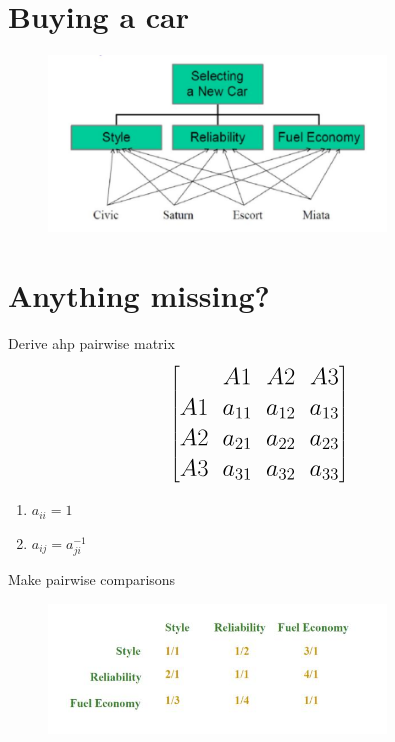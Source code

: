 \documentclass[aspectratio=1610,pdftex,dvipsnames,compress,xcolor={dvipsnames}]{beamer}
\newcommand{\acs}{\acrshort} %
\begin{document}
\section{Buying a car}


\addtocounter{framenumber}{-1}
\begin{frame}{}
    \begin{figure}
        \centering
        \includegraphics[width=0.80\textwidth]{ahp.car.jpg}
    \end{figure}
\end{frame}


\section{Anything missing?}


\addtocounter{framenumber}{-1}
\begin{frame}{Derive \acs{ahp} pairwise matrix}
    \begin{equation}
        \LARGE
        \begin{bmatrix}
               &A1 &A2 &A3 \\ 
            A1 &a_{11} &a_{12} &a_{13} \\ 
            A2 &a_{21} &a_{22} &a_{23} \\ 
            A3 &a_{31} &a_{32} &a_{33}
        \end{bmatrix} 
    \end{equation}

    \begin{enumerate}[series=outerlist,topsep=0pt,itemsep=5pt,leftmargin=*,label=(\arabic*)]
        \item[]$a_{ii}=1$
        \item[]$a_{ij}=a^{-1}_{ji}$
    \end{enumerate}
\end{frame}


\begin{frame}{Make pairwise comparisons}
    \begin{figure}
        \centering
        \includegraphics[width=0.80\textwidth]{ahp_car.criteria.jpg}
    \end{figure}
\end{frame}
\end{document}
